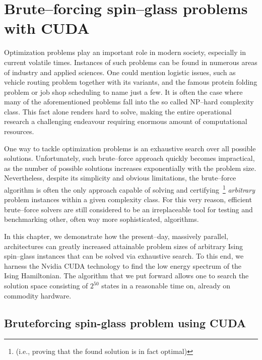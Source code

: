 \chapter{Brute--forcing spin--glass problems with CUDA}
\label{chapter:bruteforce}
Optimization problems play an important role in modern society, especially in current volatile times. Instances of such problems can be found in numerous areas of industry and applied sciences. One could mention logistic issues, such as vehicle routing problem together with its variants, and the famous protein folding problem or job shop scheduling to name just a few. It is often the case where many of the aforementioned problems fall into the so called NP--hard complexity class. This fact alone renders hard to solve, making the entire operational research a challenging endeavour requiring enormous amount of computational resources.

One way to tackle optimization problems is an exhaustive search over all possible solutions. Unfortunately, such brute--force approach quickly becomes impractical, as the number of possible solutions increases exponentially with the problem size. Nevertheless, despite its simplicity and obvious limitations, the brute--force algorithm is often the only approach capable of solving and certifying~\footnote{(i.e., proving that the found solution is in fact optimal)} \textit{arbitrary} problem instances within a given complexity class. For this very reason, efficient brute--force solvers are still considered to be an irreplaceable tool for testing and benchmarking other, often way more sophisticated, algorithms.

In this chapter, we demonstrate how the present--day, massively parallel, architectures can greatly increased attainable problem sizes of arbitrary Ising spin--glass instances that can be solved via exhaustive search. To this end, we harness the Nvidia CUDA technology  to find the low energy spectrum of the Ising Hamiltonian. The algorithm that we put forward allows one to search the solution space consisting of $2^{50}$ states in a reasonable time on, already on commodity hardware.

\section{Bruteforcing spin-glass problem using CUDA}
